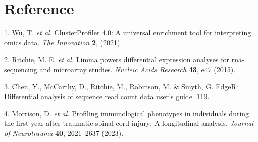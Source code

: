 \documentclass[
]{article}
\newenvironment{cslreferences}%
  {}%
  {\par}
\begin{document}
\hypertarget{bibliography}{%
\section*{Reference}\label{bibliography}}

\hypertarget{refs}{}
\begin{cslreferences}
\leavevmode\hypertarget{ref-ClusterprofilerWuTi2021}{}%
1. Wu, T. \emph{et al.} ClusterProfiler 4.0: A universal enrichment tool for interpreting omics data. \emph{The Innovation} \textbf{2}, (2021).

\leavevmode\hypertarget{ref-LimmaPowersDiRitchi2015}{}%
2. Ritchie, M. E. \emph{et al.} Limma powers differential expression analyses for rna-sequencing and microarray studies. \emph{Nucleic Acids Research} \textbf{43}, e47 (2015).

\leavevmode\hypertarget{ref-EdgerDifferenChen}{}%
3. Chen, Y., McCarthy, D., Ritchie, M., Robinson, M. \& Smyth, G. EdgeR: Differential analysis of sequence read count data user's guide. 119.

\leavevmode\hypertarget{ref-ProfilingImmunMorris2023}{}%
4. Morrison, D. \emph{et al.} Profiling immunological phenotypes in individuals during the first year after traumatic spinal cord injury: A longitudinal analysis. \emph{Journal of Neurotrauma} \textbf{40}, 2621--2637 (2023).
\end{cslreferences}
\end{document}
